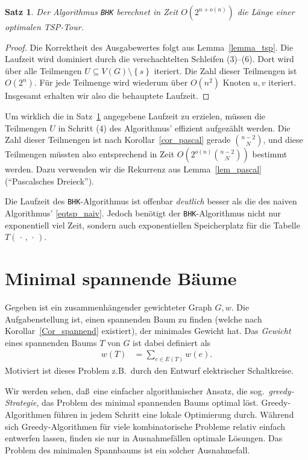 \documentclass[10pt,reqno]{amsart}
\numberwithin{equation}{section}
\renewcommand\subset{\subseteq}
\newcommand\nix{\,\cdot\,}
\newtheorem{theorem}[definition]{Satz}
\newcommand\cbc[1]{\left\{{#1}\right\}}
\newcommand\Lem{Lemma}
\newcommand\Cor{Korollar}
\begin{document}
\begin{theorem}\label{thm_bhk}
	Der Algorithmus {\tt BHK} berechnet in Zeit $O(2^{n+o(n)})$ die L\"ange einer optimalen TSP-Tour.
\end{theorem}
\begin{proof}
	Die Korrektheit des Ausgabewertes folgt aus \Lem~\ref{lemma_tsp}.
	Die Laufzeit wird dominiert durch die verschachtelten Schleifen (3)--(6).
	Dort wird \"uber alle Teilmengen $U\subset V(G)\setminus\cbc s$ iteriert.
	Die Zahl dieser Teilmengen ist $O(2^n)$.
	F\"ur jede Teilmenge wird wiederum \"uber $O(n^2)$ Knoten $u,v$ iteriert.
	Insgesamt erhalten wir also die behauptete Laufzeit.
\end{proof}

Um wirklich die in Satz~\ref{thm_bhk} angegebene Laufzeit zu erzielen, m\"ussen die Teilmengen $U$ in Schritt (4) des Algorithmus' effizient aufgez\"ahlt werden.
Die Zahl dieser Teilmengen ist nach \Cor~\ref{cor_pascal} gerade $\binom{n-2}N$, und diese Teilmengen m\"ussten also entsprechend in Zeit $O(2^{o(n)}\binom{n-2}N)$ bestimmt werden.
Dazu verwenden wir die Rekurrenz aus \Lem~\ref{lem_pascal} (``Pascalsches Dreieck'').

Die Laufzeit des {\tt BHK}-Algorithmus ist offenbar {\em deutlich} besser als die des naiven Algorithmus' \eqref{eqtsp_naiv}.
Jedoch ben\"otigt der {\tt BHK}-Algorithmus nicht nur exponentiell viel Zeit, sondern auch exponentiellen Speicherplatz f\"ur die Tabelle $T(\nix,\nix)$.

\section{Minimal spannende B\"aume}\label{sec_mst}

\noindent
Gegeben ist ein zusammenh\"angender gewichteter Graph $G,w$.
Die Aufgabenstellung ist, einen spannenden Baum zu finden (welche nach \Cor~\ref{Cor_spannend} existiert), der minimales Gewicht hat.
Das {\em Gewicht} eines spannenden Baums $T$ von $G$ ist dabei definiert als
\begin{align}\label{eqmst}
	w(T)&=\sum_{e\in E(T)}w(e).
\end{align}
Motiviert ist dieses Problem z.B.\ durch den Entwurf elektrischer Schaltkreise.

Wir werden sehen, da\ss\ eine einfacher algorithmischer Ansatz, die sog.\ {\em greedy-Strategie}, das Problem des minimal spannenden Baums optimal l\"ost.
Greedy-Algorithmen f\"uhren in jedem Schritt eine lokale Optimierung durch.
W\"ahrend sich Greedy-Algorithmen f\"ur viele kombinatorische Probleme relativ einfach entwerfen lassen, finden sie nur in Ausnahmef\"allen optimale L\"osungen.
Das Problem des minimalen Spannbaums ist ein solcher Ausnahmefall.
\end{document}
